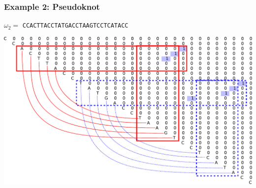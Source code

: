 \documentclass[xcolor=table]{beamer}
\begin{document}
\begin{frame}[fragile]
  \transwipe[direction=90]
  \frametitle{Example 2: Pseudoknot}
\centering
 $\omega_2=$ \texttt{CCACTTACCTATGACCTAAGTCCTCATACC}
\vspace{1cm}

\includegraphics[width=.8\textwidth]{pictures/5.pdf}

\end{frame}
\end{document}

